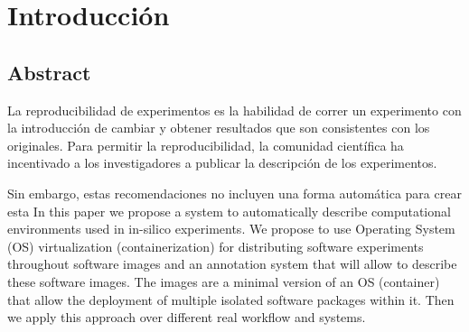 
\chapter{Introducción} %

\label{Chapter1} %


\newcommand{\keyword}[1]{\textbf{#1}}
\newcommand{\tabhead}[1]{\textbf{#1}}
\newcommand{\code}[1]{\texttt{#1}}
\newcommand{\file}[1]{\texttt{\bfseries#1}}
\newcommand{\option}[1]{\texttt{\itshape#1}}

\section{Abstract}

La reproducibilidad de experimentos es la habilidad de correr un experimento con la introducción de cambiar y obtener resultados que son consistentes con los originales. Para permitir la reproducibilidad, la comunidad científica ha incentivado a los investigadores a publicar la descripción de los experimentos.


Sin embargo, estas recomendaciones no incluyen una forma automática para crear esta 
In this paper we propose a system to automatically describe computational environments used in in-silico experiments. We propose to use Operating System (OS) virtualization (containerization) for distributing software experiments throughout software images and an annotation system that will allow to describe these software images. The images are a minimal version of an OS (container) that allow the deployment of multiple isolated software packages within it. 
Then we apply this approach over different real workflow and 
systems.

